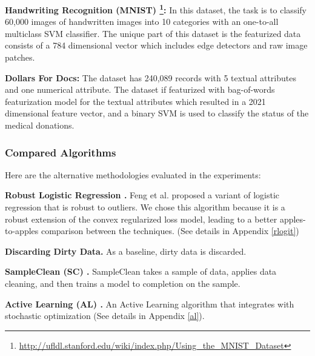 \vspace{0.25em}

\noindent\textbf{Handwriting Recognition (MNIST) \footnote{\scriptsize\url{http://ufldl.stanford.edu/wiki/index.php/Using_the_MNIST_Dataset}}: } In this dataset, the task is to classify 60,000 images of handwritten images into 10 categories with an one-to-all multiclass SVM classifier. The unique part of this dataset is the featurized data consists of a 784 dimensional vector which includes edge detectors and raw image patches. 

\vspace{0.25em}

\noindent\textbf{Dollars For Docs: } The dataset has 240,089 records with 5 textual attributes and one numerical attribute.
The dataset if featurized with bag-of-words featurization model for the textual attributes which resulted in a 2021 dimensional feature vector, and a binary SVM is used to classify the status of the medical donations.

\subsubsection{Compared Algorithms}
\noindent Here are the alternative methodologies evaluated in the experiments:

\vspace{0.25em}

\noindent\textbf{Robust Logistic Regression \cite{feng2014robust}. } Feng et al. proposed a variant of logistic regression that is robust to outliers. We chose this algorithm because it is a robust extension of the convex regularized loss model, leading to a better apples-to-apples comparison between the techniques. (See details in Appendix \ref{rlogit})  

\vspace{0.25em}

\noindent\textbf{Discarding Dirty Data. } As a baseline, dirty data is discarded.

\vspace{0.25em}

\noindent\textbf{SampleClean (SC) \cite{wang1999sample}. } SampleClean takes a sample of data, applies data cleaning, and then trains a model to completion on the sample.

\vspace{0.25em}

\noindent\textbf{Active Learning (AL) \cite{guillory2009active}. } An Active Learning algorithm that integrates with stochastic optimization (See details in Appendix \ref{al}). 

